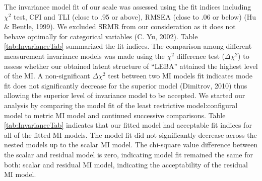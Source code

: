 \documentclass[
  english,
  man]{apa6}
\begin{document}
The invariance model fit of our scale was assessed using the fit indices including \(\chi^2\) test, CFI and TLI (close to .95 or above), RMSEA (close to .06 or below) (Hu \& Bentle, 1999). We excluded SRMR from our consideration as it does not behave optimally for categorical variables (C. Yu, 2002). Table \ref{tab:InvarianceTab} summarized the fit indices. The comparison among different measurement invariance models was made using the \(\chi^2\) difference test (\(\Delta \chi^2\)) to assess whether our obtained latent structure of ``LEBA'' attained the highest level of the MI. A non-significant \(\Delta \chi^2\) test between two MI models fit indicates mode fit does not significantly decrease for the superior model (Dimitrov, 2010) thus allowing the superior level of invariance model to be accepted. We started our analysis by comparing the model fit of the least restrictive model:configural model to metric MI model and continued successive comparisons. Table \ref{tab:InvarianceTab} indicates that our fitted model had acceptable fit indices for all of the fitted MI models. The model fit did not significantly decrease across the nested models up to the scalar MI model. The chi-square value difference between the scalar and residual model is zero, indicating model fit remained the same for both: scalar and residual MI model, indicating the acceptability of the residual MI model.
\end{document}
